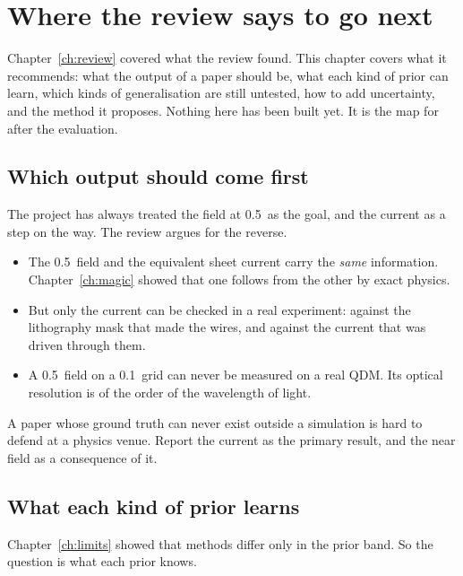 \chapter{Where the review says to go next}\label{ch:next}

Chapter~\ref{ch:review} covered what the review found. This chapter covers what it recommends: what the output of a
paper should be, what each kind of prior can learn, which kinds of generalisation are still untested, how to add
uncertainty, and the method it proposes. Nothing here has been built yet. It is the map for after the evaluation.

\section{Which output should come first}

The project has always treated the field at 0.5\um\ as the goal, and the current as a step on the way. The review argues
for the reverse.

\begin{itemize}
\item The 0.5\um\ field and the equivalent sheet current carry the \emph{same} information. Chapter~\ref{ch:magic} showed
that one follows from the other by exact physics.
\item But only the current can be checked in a real experiment: against the lithography mask that made the wires, and
against the current that was driven through them.
\item A 0.5\um\ field on a 0.1\um\ grid can never be measured on a real QDM. Its optical resolution is of the order of the
wavelength of light.
\end{itemize}

\begin{keyidea}
A paper whose ground truth can never exist outside a simulation is hard to defend at a physics venue. Report the
current as the primary result, and the near field as a consequence of it.
\end{keyidea}

\section{What each kind of prior learns}

Chapter~\ref{ch:limits} showed that methods differ only in the prior band. So the question is what each prior knows.

